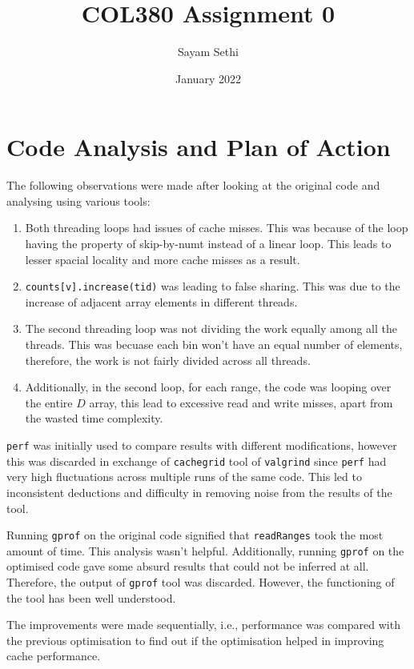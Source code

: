 \documentclass[11pt]{article}
\title{COL380 Assignment 0}
\author{Sayam Sethi}
\date{January 2022}
\begin{document}
\maketitle

\tableofcontents

\section{Code Analysis and Plan of Action}
The following observations were made after looking at the original code and analysing using various tools:
\begin{enumerate}
	\item Both threading loops had issues of cache misses. This was because of the loop having the property of skip-by-numt instead of a linear loop. This leads to lesser spacial locality and more cache misses as a result.
	\item \texttt{counts[v].increase(tid)} was leading to false sharing. This was due to the increase of adjacent array elements in different threads.
	\item The second threading loop was not dividing the work equally among all the threads. This was becuase each bin won't have an equal number of elements, therefore, the work is not fairly divided across all threads.
	\item Additionally, in the second loop, for each range, the code was looping over the entire $D$ array, this lead to excessive read and write misses, apart from the wasted time complexity.
\end{enumerate}
\texttt{perf} was initially used to compare results with different modifications, however this was discarded in exchange of \texttt{cachegrid} tool of \texttt{valgrind} since \texttt{perf} had very high fluctuations across multiple runs of the same code. This led to inconsistent deductions and difficulty in removing noise from the results of the tool.\par
Running \texttt{gprof} on the original code signified that \texttt{readRanges} took the most amount of time. This analysis wasn't helpful. Additionally, running \texttt{gprof} on the optimised code gave some absurd results that could not be inferred at all. Therefore, the output of \texttt{gprof} tool was discarded. However, the functioning of the tool has been well understood.\par
The improvements were made sequentially, i.e., performance was compared with the previous optimisation to find out if the optimisation helped in improving cache performance.
\end{document}
